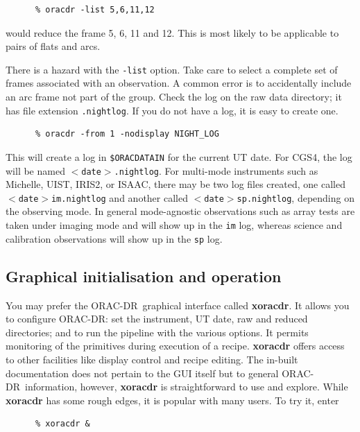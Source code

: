 \documentclass[twoside,11pt]{article}
\newcommand{\htmlref}[2]{#1}
\newcommand{\xref}[3]{#1}
\newcommand{\xlabel}[1]{}
\renewcommand{\_}{\texttt{\symbol{95}}}
\newcommand{\ORACDR}{{\footnotesize ORAC-DR}}
\begin{document}
\begin{verbatim}
      % oracdr -list 5,6,11,12
\end{verbatim}
would reduce the frame 5, 6, 11 and 12. This is most likely to
be applicable to pairs of flats and arcs.

There is a hazard with the {\tt -list} option. Take care to select
a complete set of frames associated with an observation. A common
error is to accidentally include an arc frame not part of the
group. Check the log on the raw data directory; it has file
extension {\tt .nightlog}. If you do not have a log, it is easy to
create one.
\label{night_log}

\begin{verbatim}
      % oracdr -from 1 -nodisplay NIGHT_LOG
\end{verbatim}
This will create a log in {\tt \$ORAC\_DATA\_IN} for the current
UT date. For CGS4, the log will be named {\tt $<$date$>$.nightlog}.
For multi-mode instruments such as Michelle, UIST, IRIS2, or ISAAC,
there may be two log files created, one called {\tt $<$date$>$\_im.nightlog}
and another called {\tt $<$date$>$\_sp.nightlog}, depending on the
observing mode. In general mode-agnostic observations such as array
tests are taken under imaging mode and will show up in the
{\tt \_im} log, whereas science and calibration observations will
show up in the {\tt \_sp} log.

\subsection{\xlabel{graphical_initialisation_and_operation}Graphical initialisation and
operation\label{graphical_initialisation_and_operation}}

You may prefer the \ORACDR\ graphical interface called
\xref{{\bf xoracdr}}{sun230}{xoracdr}.
  It allows you to configure
ORAC-DR: set the instrument, UT date, raw and reduced directories; and
to run the pipeline with the various options.  It permits monitoring
of the primitives during execution of a recipe. {\bf xoracdr} offers
access to other facilities like
\htmlref{display control}{display} and recipe editing.  The in-built
documentation does not pertain to the GUI itself but to general
\ORACDR\ information, however, {\bf xoracdr} is straightforward to use
and explore.  While {\bf xoracdr} has some rough edges, it is popular
with many users.  To try it, enter

\begin{verbatim}
      % xoracdr &
\end{verbatim}
\end{document}
